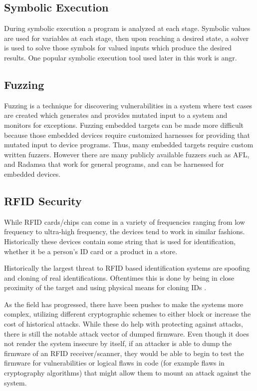 \documentclass[conference]{IEEEtran}
\begin{document}
\subsection{Symbolic Execution}
During symbolic execution a program is analyzed at each stage. Symbolic values are used for variables at each stage, then upon reaching a desired state, a solver is used to solve those symbols for valued inputs which produce the desired results\cite{symmex}. One popular symbolic execution tool used later in this work is angr\cite{angr}.

\subsection{Fuzzing}

Fuzzing is a technique for discovering vulnerabilities in a system where test cases are created  which generates and provides mutated input to a system and monitors for exceptions. Fuzzing embedded targets can be made more difficult because those embedded devices require customized harnesses for providing that mutated input to device programs. Thus, many embedded targets require custom written fuzzers. However there are many publicly available fuzzers such as AFL\cite{afl}, and Radamsa\cite{radamsa} that work for general programs, and can be harnessed for embedded devices.

\subsection{RFID Security}
While RFID cards/chips can come in a variety of frequencies ranging from low frequency to ultra-high frequency, the devices tend to work in similar fashions. Historically these devices contain some string that is used for identification\cite{rfidsec2}, whether it be a person's ID card or a product in a store\cite{rfidsec2}.

Historically the largest threat to RFID based identification systems are spoofing and cloning of real identifications. Oftentimes this is done by being in close proximity of the target and using physical means for cloning IDs \cite{rfidsec1}.

As the field has progressed, there have been pushes to make the systems more complex, utilizing different cryptographic schemes to either block or increase the cost of historical attacks\cite{rfidsec1}\cite{rfidsec2}. While these do help with protecting against attacks, there is still the notable attack vector of dumped firmware. Even though it does not render the system insecure by itself, if an attacker is able to dump the firmware of an RFID receiver/scanner, they would be able to begin to test the firmware for vulnerabilities or logical flaws in code (for example flaws in cryptography algorithms) that might allow them to mount an attack against the system. 
\end{document}
